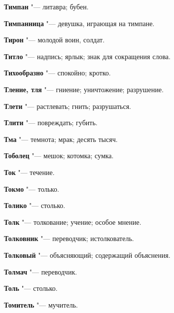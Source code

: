 \begin{mymulticols}{2}
\noindent\textbf{Тимпан} "--- литавра; бубен. 




\noindent\textbf{Тимпанница} "--- девушка, играющая на тимпане. 




\noindent\textbf{Тирон} "--- молодой воин, солдат. 




\noindent\textbf{Титло} "--- надпись; ярлык; знак для сокращения слова. 




\noindent\textbf{Тихообразно} "--- спокойно; кротко. 




\noindent\textbf{Тление, тля} "--- гниение; уничтожение; разрушение. 




\noindent\textbf{Тлети} "--- растлевать; гнить; разрушаться. 




\noindent\textbf{Тлити} "--- повреждать; губить. 




\noindent\textbf{Тма} "--- темнота; мрак; десять тысяч. 




\noindent\textbf{Тоболец} "--- мешок; котомка; сумка. 




\noindent\textbf{Ток} "--- течение. 




\noindent\textbf{Токмо} "--- только. 




\noindent\textbf{Толико} "--- столько. 




\noindent\textbf{Толк} "--- толкование; учение; особое мнение. 




\noindent\textbf{Толковник} "--- переводчик; истолкователь. 




\noindent\textbf{Толковый} "--- объясняющий; содержащий объяснения. 




\noindent\textbf{Толмач} "--- переводчик. 




\noindent\textbf{Толь} "--- столько. 




\noindent\textbf{Томитель} "--- мучитель. 





\end{mymulticols}
